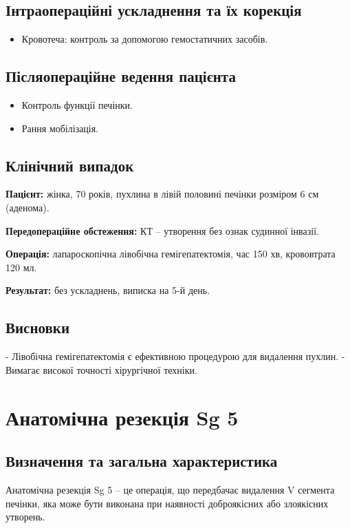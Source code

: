 \begin{refsection}
\subsection{Інтраопераційні ускладнення та їх корекція}
\begin{itemize}
    \item Кровотеча: контроль за допомогою гемостатичних засобів.
\end{itemize}

\subsection{Післяопераційне ведення пацієнта}
\begin{itemize}
    \item Контроль функції печінки.
    \item Рання мобілізація.
\end{itemize}

\subsection{Клінічний випадок}
\textbf{Пацієнт:} жінка, 70 років, пухлина в лівій половині печінки розміром 6 см (аденома).

\textbf{Передопераційне обстеження:} КТ – утворення без ознак судинної інвазії.

\textbf{Операція:} лапароскопічна лівобічна гемігепатектомія, час 150 хв, крововтрата 120 мл.

\textbf{Результат:} без ускладнень, виписка на 5-й день.

\subsection{Висновки}
- Лівобічна гемігепатектомія є ефективною процедурою для видалення пухлин.
- Вимагає високої точності хірургічної техніки.

\section{Анатомічна резекція Sg 5}
\subsection{Визначення та загальна характеристика}
Анатомічна резекція Sg 5 – це операція, що передбачає видалення V сегмента печінки, яка може бути виконана при наявності доброякісних або злоякісних утворень.


\end{refsection}
